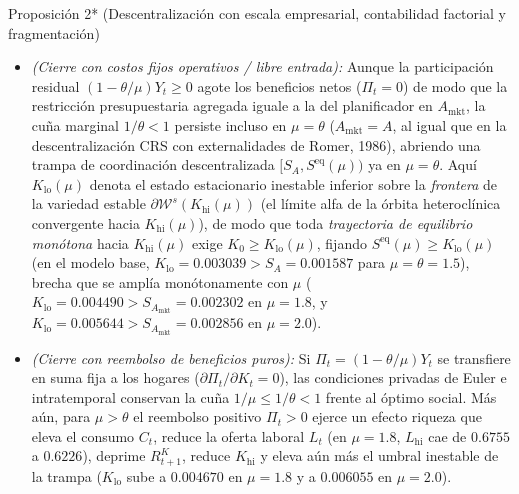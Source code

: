 \documentclass[11pt,letterpaper]{article}
\theoremstyle{plain}
\newtheorem*{namedthm}{\protect\namedthmname}
\newcommand{\namedthmname}{}
\newenvironment{thm_box}[1]{\renewcommand{\namedthmname}{#1}\begin{namedthm}}{\end{namedthm}}
\begin{document}
\begin{thm_box}{Proposición 2* (Descentralización con escala empresarial, contabilidad factorial y fragmentación)}
\begin{enumerate}
\begin{itemize}
\item \emph{(Cierre con costos fijos operativos / libre entrada):} Aunque la participación residual $(1-\theta/\mu)Y_t\ge 0$ agote los beneficios netos ($\Pi_t=0$) de modo que la restricción presupuestaria agregada iguale a la del planificador en $A_{\mathrm{mkt}}$, la cuña marginal $1/\theta<1$ persiste incluso en $\mu=\theta$ ($A_{\mathrm{mkt}}=A$, al igual que en la descentralización CRS con externalidades de Romer, 1986), abriendo una trampa de coordinación descentralizada $[S_A, S^{\mathrm{eq}}(\mu))$ ya en $\mu=\theta$. Aquí $K_{\mathrm{lo}}(\mu)$ denota el estado estacionario inestable inferior sobre la \emph{frontera} de la variedad estable $\partial\mathcal{W}^s(K_{\mathrm{hi}}(\mu))$ (el límite alfa de la órbita heteroclínica convergente hacia $K_{\mathrm{hi}}(\mu)$), de modo que toda \emph{trayectoria de equilibrio monótona} hacia $K_{\mathrm{hi}}(\mu)$ exige $K_0\ge K_{\mathrm{lo}}(\mu)$, fijando $S^{\mathrm{eq}}(\mu)\ge K_{\mathrm{lo}}(\mu)$ (en el modelo base, $K_{\mathrm{lo}}=0.003039 > S_A=0.001587$ para $\mu=\theta=1.5$), brecha que se amplía monótonamente con $\mu$ ($K_{\mathrm{lo}}=0.004490 > S_{A_{\mathrm{mkt}}}=0.002302$ en $\mu=1.8$, y $K_{\mathrm{lo}}=0.005644 > S_{A_{\mathrm{mkt}}}=0.002856$ en $\mu=2.0$).
\item \emph{(Cierre con reembolso de beneficios puros):} Si $\Pi_t=(1-\theta/\mu)Y_t$ se transfiere en suma fija a los hogares ($\partial\Pi_t/\partial K_t=0$), las condiciones privadas de Euler e intratemporal conservan la cuña $1/\mu\le 1/\theta<1$ frente al óptimo social. Más aún, para $\mu>\theta$ el reembolso positivo $\Pi_t>0$ ejerce un efecto riqueza que eleva el consumo $C_t$, reduce la oferta laboral $L_t$ (en $\mu=1.8$, $L_{\mathrm{hi}}$ cae de $0.6755$ a $0.6226$), deprime $R_{t+1}^K$, reduce $K_{\mathrm{hi}}$ y eleva aún más el umbral inestable de la trampa ($K_{\mathrm{lo}}$ sube a $0.004670$ en $\mu=1.8$ y a $0.006055$ en $\mu=2.0$).
\end{itemize}
\end{enumerate}
\end{thm_box}
\end{document}
